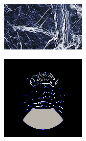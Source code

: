 \begin{figure}[]
\begin{subfigure}{\textwidth}
        \begin{subfigure}{0.19\textwidth}
            \centering
            \includegraphics[width=\textwidth]{images/04-experiment03/ball_marble_target.jpg}
            \caption*{}
        \end{subfigure}
        \hfill
        \begin{subfigure}{0.19\textwidth}
            \centering
            \includegraphics[width=\textwidth]{images/04-experiment03/ball_dof/marble/stats_im.jpg}
            \caption*{}
        \end{subfigure}
        \hfill
        \begin{subfigure}{0.19\textwidth}

\end{subfigure}
\end{subfigure}
\end{figure}
